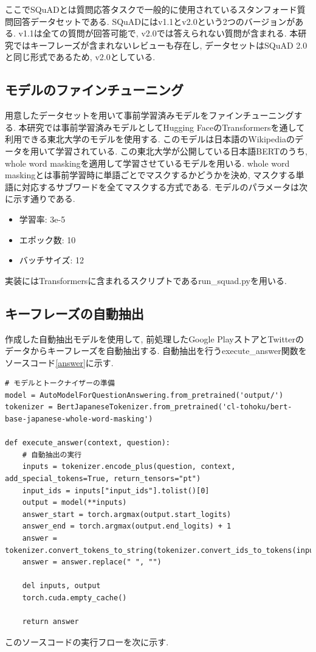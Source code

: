 ここでSQuADとは質問応答タスクで一般的に使用されているスタンフォード質問回答データセットである. 
SQuADにはv1.1とv2.0という2つのバージョンがある. v1.1は全ての質問が回答可能で, v2.0では答えられない質問が含まれる. 本研究ではキーフレーズが含まれないレビューも存在し, データセットはSQuAD 2.0と同じ形式であるため, v2.0としている. 

\subsection{モデルのファインチューニング}
用意したデータセットを用いて事前学習済みモデルをファインチューニングする. 本研究では事前学習済みモデルとしてHugging FaceのTransformersを通して利用できる東北大学のモデル\cite{tohoku}を使用する. このモデルは日本語のWikipediaのデータを用いて学習されている\cite{tohoku}. 
この東北大学が公開している日本語BERTのうち, whole word maskingを適用して学習させているモデル\cite{masking}を用いる. whole word maskingとは事前学習時に単語ごとでマスクするかどうかを決め, マスクする単語に対応するサブワードを全てマスクする方式である. モデルのパラメータは次に示す通りである. 
\begin{itemize}
  \item 学習率: 3e-5
  \item エポック数: 10
  \item バッチサイズ: 12
\end{itemize}
実装にはTransformersに含まれるスクリプトであるrun\_squad.pyを用いる. 

\subsection{キーフレーズの自動抽出}
作成した自動抽出モデルを使用して, 前処理したGoogle PlayストアとTwitterのデータからキーフレーズを自動抽出する. 自動抽出を行うexecute\_answer関数をソースコード\ref{answer}に示す. 
\begin{lstlisting}[caption=execute\_answer関数,label=answer]
# モデルとトークナイザーの準備
model = AutoModelForQuestionAnswering.from_pretrained('output/')  
tokenizer = BertJapaneseTokenizer.from_pretrained('cl-tohoku/bert-base-japanese-whole-word-masking') 

def execute_answer(context, question):
    # 自動抽出の実行
    inputs = tokenizer.encode_plus(question, context, add_special_tokens=True, return_tensors="pt")
    input_ids = inputs["input_ids"].tolist()[0]
    output = model(**inputs)
    answer_start = torch.argmax(output.start_logits)  
    answer_end = torch.argmax(output.end_logits) + 1 
    answer = tokenizer.convert_tokens_to_string(tokenizer.convert_ids_to_tokens(input_ids[answer_start:answer_end]))
    answer = answer.replace(" ", "")

    del inputs, output
    torch.cuda.empty_cache()

    return answer
\end{lstlisting}
このソースコードの実行フローを次に示す.  

